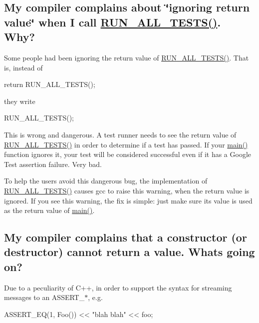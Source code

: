 \subsection*{My compiler complains about \char`\"{}ignoring return value\char`\"{} when I call \hyperlink{gtest_8h_a853a3792807489591d3d4a2f2ff9359f}{R\+U\+N\+\_\+\+A\+L\+L\+\_\+\+T\+E\+S\+T\+S()}. Why?}

Some people had been ignoring the return value of {\ttfamily \hyperlink{gtest_8h_a853a3792807489591d3d4a2f2ff9359f}{R\+U\+N\+\_\+\+A\+L\+L\+\_\+\+T\+E\+S\+T\+S()}}. That is, instead of


\begin{DoxyCode}
return RUN\_ALL\_TESTS();
\end{DoxyCode}


they write


\begin{DoxyCode}
RUN\_ALL\_TESTS();
\end{DoxyCode}


This is wrong and dangerous. A test runner needs to see the return value of {\ttfamily \hyperlink{gtest_8h_a853a3792807489591d3d4a2f2ff9359f}{R\+U\+N\+\_\+\+A\+L\+L\+\_\+\+T\+E\+S\+T\+S()}} in order to determine if a test has passed. If your {\ttfamily \hyperlink{app_2main_8cpp_ae66f6b31b5ad750f1fe042a706a4e3d4}{main()}} function ignores it, your test will be considered successful even if it has a Google Test assertion failure. Very bad.

To help the users avoid this dangerous bug, the implementation of {\ttfamily \hyperlink{gtest_8h_a853a3792807489591d3d4a2f2ff9359f}{R\+U\+N\+\_\+\+A\+L\+L\+\_\+\+T\+E\+S\+T\+S()}} causes gcc to raise this warning, when the return value is ignored. If you see this warning, the fix is simple\+: just make sure its value is used as the return value of {\ttfamily \hyperlink{app_2main_8cpp_ae66f6b31b5ad750f1fe042a706a4e3d4}{main()}}.

\subsection*{My compiler complains that a constructor (or destructor) cannot return a value. What\textquotesingle{}s going on?}

Due to a peculiarity of C++, in order to support the syntax for streaming messages to an {\ttfamily A\+S\+S\+E\+R\+T\+\_\+$\ast$}, e.\+g.


\begin{DoxyCode}
ASSERT\_EQ(1, Foo()) << "blah blah" << foo;
\end{DoxyCode}


